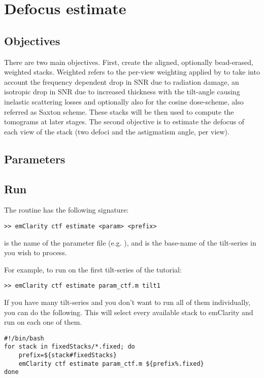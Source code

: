 \section{Defocus estimate} \label{sec:defocus_estimate}

\subsection{Objectives}

There are two main objectives. First, create the aligned, optionally bead-erased, weighted stacks. Weighted refers to the per-view weighting applied by {\emClarity} to take into account the frequency dependent drop in SNR due to radiation damage, an isotropic drop in SNR due to increased thickness with the tilt-angle causing inelastic scattering losses and optionally also for the cosine dose-scheme, also referred as Saxton scheme. These stacks will be then used to compute the tomograms at later stages. The second objective is to estimate the defocus of each view of the stack (two defoci and the astigmatism angle, per view).

\subsection{Parameters}



\subsection{Run}

The  routine has the following signature:
\begin{lstlisting}
>> emClarity ctf estimate <param> <prefix>
\end{lstlisting}
 is the name of the parameter file (e.g. ), and  is the base-name of the tilt-series in  you wish to process.

For example, to run  on the first tilt-series of the tutorial:
\begin{lstlisting}
>> emClarity ctf estimate param_ctf.m tilt1
\end{lstlisting}

If you have many tilt-series and you don't want to run all of them individually, you can do the following. This will select every available stack to emClarity and run  on each one of them.
\newpage
\begin{lstlisting}
#!/bin/bash
for stack in fixedStacks/*.fixed; do
    prefix=${stack#fixedStacks}
    emClarity ctf estimate param_ctf.m ${prefix%.fixed}
done
\end{lstlisting}

